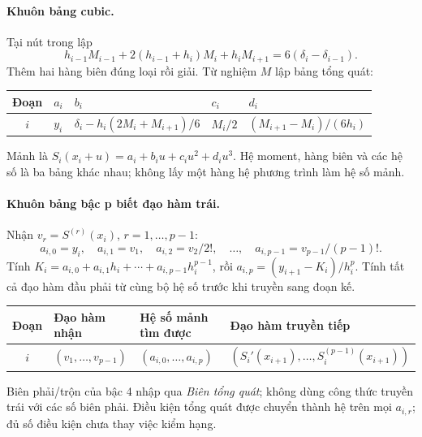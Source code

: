 \paragraph{Khuôn bảng cubic.} Tại nút trong lập
\[
h_{i-1}M_{i-1}+2(h_{i-1}+h_i)M_i+h_iM_{i+1}=6(\delta_i-\delta_{i-1}).
\]
Thêm hai hàng biên đúng loại rồi giải. Từ nghiệm $M$ lập bảng tổng quát:
\begin{center}\small\begin{tabular}{cllll}\toprule
Đoạn&$a_i$&$b_i$&$c_i$&$d_i$\\\midrule
$i$&$y_i$&$\delta_i-h_i(2M_i+M_{i+1})/6$&$M_i/2$&$(M_{i+1}-M_i)/(6h_i)$\\\bottomrule
\end{tabular}\end{center}
Mảnh là $S_i(x_i+u)=a_i+b_iu+c_iu^2+d_iu^3$. Hệ moment, hàng biên và các hệ số là ba bảng khác nhau; không lấy một hàng hệ phương trình làm hệ số mảnh.

\paragraph{Khuôn bảng bậc p biết đạo hàm trái.} Nhận $v_r=S^{(r)}(x_i)$, $r=1,\ldots,p-1$:
\[
a_{i,0}=y_i,\quad a_{i,1}=v_1,\quad a_{i,2}=v_2/2!,\quad\ldots,\quad a_{i,p-1}=v_{p-1}/(p-1)!.
\]
Tính $K_i=a_{i,0}+a_{i,1}h_i+\cdots+a_{i,p-1}h_i^{p-1}$, rồi $a_{i,p}=(y_{i+1}-K_i)/h_i^p$. Tính tất cả đạo hàm đầu phải từ cùng bộ hệ số trước khi truyền sang đoạn kế.
\begin{center}\small\begin{tabular}{clll}\toprule
Đoạn&Đạo hàm nhận&Hệ số mảnh tìm được&Đạo hàm truyền tiếp\\\midrule
$i$&$(v_1,\ldots,v_{p-1})$&$(a_{i,0},\ldots,a_{i,p})$&$(S_i'(x_{i+1}),\ldots,S_i^{(p-1)}(x_{i+1}))$\\\bottomrule
\end{tabular}\end{center}
Biên phải/trộn của bậc 4 nhập qua \emph{Biên tổng quát}; không dùng công thức truyền trái với các số biên phải. Điều kiện tổng quát được chuyển thành hệ trên mọi $a_{i,r}$; đủ số điều kiện chưa thay việc kiểm hạng.

